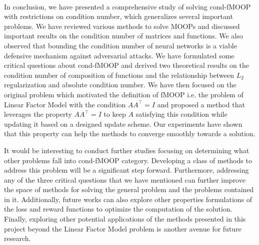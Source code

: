 \newpage
{}

 \paragraph{} In conclusion, we have presented a comprehensive study of solving cond-fMOOP with restrictions on condition number, which generalizes several important problems. We have reviewed various methods to solve MOOPs and discussed important results on the condition number of matrices and functions. We also observed that bounding the condition number of neural networks is a viable defensive mechanism against adversarial attacks. We have formulated some critical questions about cond-fMOOP and derived two theoretical results on the condition number of composition of functions and the relationship between $L_2$ regularization and absolute condition number. We have then focused on the original problem which motivated the definition of fMOOP i.e. the problem of Linear Factor Model with the condition $AA^\top = I$ and proposed a method that leverages the property $AA^\top=I$ to keep $A$ satisfying this condition while updating it based on a designed update scheme. Our experiments have shown that this property can help the methods to converge smoothly towards a solution.
 
 It would be interesting to conduct further studies focusing on determining what other problems fall into cond-fMOOP category. Developing a class of methods to address this problem will be a significant step forward. Furthermore, addressing any of the three critical questions that we have mentioned can further improve the space of methods for solving the general problem and the problems contained in it. Additionally, future works can also explore other properties formulations of the loss and reward functions to optimize the computation of the solution. Finally, exploring other potential applications of the methods presented in this project beyond the Linear Factor Model problem is another avenue for future research.




